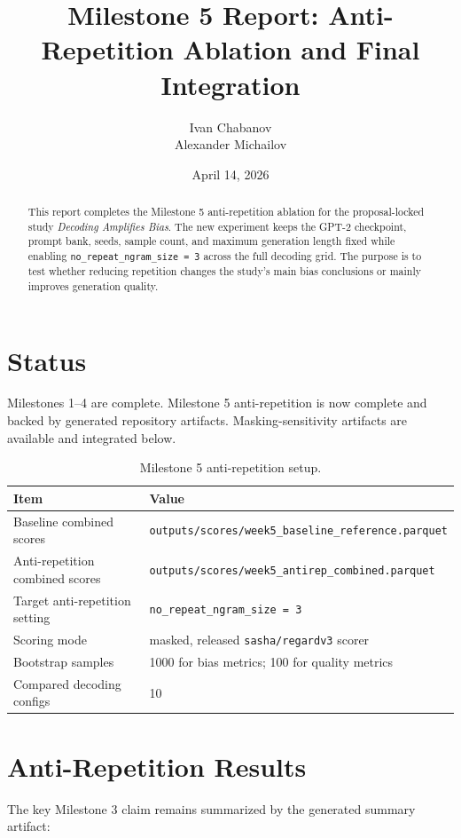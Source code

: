 \documentclass[11pt]{article}
\title{Milestone 5 Report: Anti-Repetition Ablation and Final Integration}
\author{Ivan Chabanov \\ Alexander Michailov}
\date{April 14, 2026}
\begin{document}
\maketitle

\begin{abstract}
This report completes the Milestone 5 anti-repetition ablation for the proposal-locked study
\textit{Decoding Amplifies Bias}. The new experiment keeps the GPT-2 checkpoint, prompt bank,
seeds, sample count, and maximum generation length fixed while enabling
\texttt{no\_repeat\_ngram\_size = 3} across the full decoding grid. The purpose is to test
whether reducing repetition changes the study's main bias conclusions or mainly improves generation
quality.
\end{abstract}

\section{Status}
Milestones 1--4 are complete. Milestone 5 anti-repetition is now complete and backed by generated repository
artifacts. Masking-sensitivity artifacts are available and integrated below.

\begin{table}[t]
\centering
\small
\begin{tabularx}{\linewidth}{@{}lX@{}}
\toprule
Item & Value \\
\midrule
Baseline combined scores & \texttt{outputs/scores/week5\_baseline\_reference.parquet} \\
Anti-repetition combined scores & \texttt{outputs/scores/week5\_antirep\_combined.parquet} \\
Target anti-repetition setting & \texttt{no\_repeat\_ngram\_size = 3} \\
Scoring mode & masked, released \texttt{sasha/regardv3} scorer \\
Bootstrap samples & 1000 for bias metrics; 100 for quality metrics \\
Compared decoding configs & 10 \\
\bottomrule
\end{tabularx}
\caption{Milestone 5 anti-repetition setup.}
\end{table}

\section{Anti-Repetition Results}
The key Milestone 3 claim remains summarized by the generated summary artifact:
\end{document}
